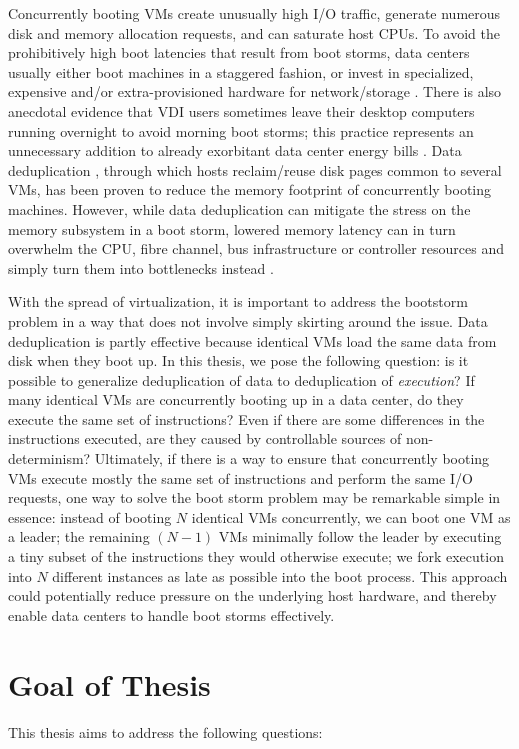 Concurrently booting VMs create unusually high I/O traffic,
generate numerous disk and memory allocation requests,
and can saturate host CPUs. 
To avoid the prohibitively high boot latencies that  
result from boot storms, data centers usually either 
boot machines in a staggered fashion, or invest in specialized,
expensive and/or extra-provisioned hardware for network/storage \cite{highperfnas, liao2011vmstore}.
There is also anecdotal evidence that VDI users sometimes leave their desktop computers running
overnight to avoid morning boot storms; this practice
represents an unnecessary addition to already exorbitant
data center energy bills \cite{qureshi2009bills}. Data deduplication \cite{clements2009deduplication},
through which hosts reclaim/reuse disk pages common to several VMs, 
has been proven to reduce the memory footprint of concurrently
booting machines. However, while data deduplication can mitigate the stress on the memory subsystem in
a boot storm, lowered memory latency can in turn overwhelm the CPU, 
fibre channel, bus infrastructure or controller resources 
and simply turn them into bottlenecks instead \cite{netappstorm}. 

With the spread of virtualization, it is important to address the
bootstorm problem in a way that does not involve simply skirting around the
issue. Data deduplication is partly effective because identical VMs load
the same data from disk when they boot up. In this thesis, we pose the following question: 
is it possible to generalize deduplication of data to deduplication of \emph{execution}?
If many identical VMs are concurrently booting up in a data center, 
do they execute the same set of instructions? Even if there are
some differences in the instructions executed, are they caused by
controllable sources of non-determinism? Ultimately, if there is a way
to ensure that concurrently booting VMs execute mostly the same set of instructions
and perform the same I/O requests, one way to solve the boot storm
problem may be remarkable simple in essence: instead of booting
$N$ identical VMs concurrently, we can boot one VM as a leader; the remaining $(N-1)$ VMs minimally
follow the leader by executing a tiny subset of the instructions they would otherwise execute;
we fork execution into $N$ different instances as late as possible into the boot process. This approach
could potentially reduce pressure on the underlying host hardware,
and thereby enable data centers to handle boot storms effectively.

\section{Goal of Thesis}
This thesis aims to address the following questions:

